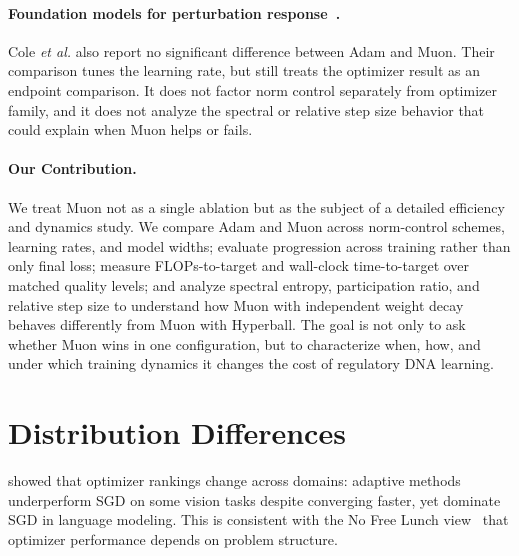\documentclass{article}
\begin{document}
\paragraph{Foundation models for perturbation response~\citep{fmpert}.} Cole \emph{et al.} also report no significant difference between Adam and Muon. Their comparison tunes the learning rate, but still treats the optimizer result as an endpoint comparison. It does not factor norm control separately from optimizer family, and it does not analyze the spectral or relative step size behavior that could explain when Muon helps or fails.

\paragraph{Our Contribution.} We treat Muon not as a single ablation but as the subject of a detailed efficiency and dynamics study. We compare Adam and Muon across norm-control schemes, learning rates, and model widths; evaluate progression across training rather than only final loss; measure FLOPs-to-target and wall-clock time-to-target over matched quality levels; and analyze spectral entropy, participation ratio, and relative step size to understand how Muon with independent weight decay behaves differently from Muon with Hyperball. The goal is not only to ask whether Muon wins in one configuration, but to characterize when, how, and under which training dynamics it changes the cost of regulatory DNA learning.


\section{Distribution Differences}
\label{sec:distribution}

\citet{wilson} showed that optimizer rankings change across domains: adaptive methods underperform SGD on some vision tasks despite converging faster, yet dominate SGD in language modeling. This is consistent with the No Free Lunch view~\citep{nfl} that optimizer performance depends on problem structure.
\end{document}

